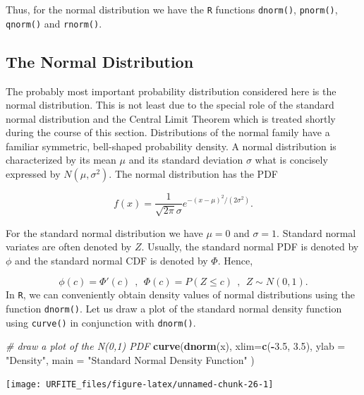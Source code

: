 \documentclass[]{book}
\newenvironment{Shaded}{\begin{snugshade}}{\end{snugshade}}
\newcommand{\KeywordTok}[1]{\textcolor[rgb]{0.13,0.29,0.53}{\textbf{#1}}}
\newcommand{\DataTypeTok}[1]{\textcolor[rgb]{0.13,0.29,0.53}{#1}}
\newcommand{\FloatTok}[1]{\textcolor[rgb]{0.00,0.00,0.81}{#1}}
\newcommand{\StringTok}[1]{\textcolor[rgb]{0.31,0.60,0.02}{#1}}
\newcommand{\CommentTok}[1]{\textcolor[rgb]{0.56,0.35,0.01}{\textit{#1}}}
\newcommand{\OperatorTok}[1]{\textcolor[rgb]{0.81,0.36,0.00}{\textbf{#1}}}
\newcommand{\NormalTok}[1]{#1}
\theoremstyle{definition}
\theoremstyle{definition}
\theoremstyle{definition}
\theoremstyle{remark}
\begin{document}
Thus, for the normal distribution we have the \texttt{R} functions
\texttt{dnorm()}, \texttt{pnorm()}, \texttt{qnorm()} and
\texttt{rnorm()}.

\subsection*{The Normal Distribution}\label{the-normal-distribution}

The probably most important probability distribution considered here is
the normal distribution. This is not least due to the special role of
the standard normal distribution and the Central Limit Theorem which is
treated shortly during the course of this section. Distributions of the
normal family have a familiar symmetric, bell-shaped probability
density. A normal distribution is characterized by its mean \(\mu\) and
its standard deviation \(\sigma\) what is concisely expressed by
\(N(\mu,\sigma^2)\). The normal distribution has the PDF

\[ f(x) = \frac{1}{\sqrt{2 \pi} \sigma} e^{-(x - μ)^2/(2 σ^2)}. \]

For the standard normal distribution we have \(\mu=0\) and \(\sigma=1\).
Standard normal variates are often denoted by \(Z\). Usually, the
standard normal PDF is denoted by \(\phi\) and the standard normal CDF
is denoted by \(\Phi\). Hence,

\[ \phi(c) = \Phi'(c) \ \ , \ \ \Phi(c) = P(Z \leq c) \ \ , \ \ Z \sim N(0,1).
\] In \texttt{R}, we can conveniently obtain density values of normal
distributions using the function \texttt{dnorm()}. Let us draw a plot of
the standard normal density function using \texttt{curve()} in
conjunction with \texttt{dnorm()}.

\begin{Shaded}
\begin{Highlighting}[]
\CommentTok{# draw a plot of the N(0,1) PDF}
\KeywordTok{curve}\NormalTok{(}\KeywordTok{dnorm}\NormalTok{(x),}
      \DataTypeTok{xlim=}\KeywordTok{c}\NormalTok{(}\OperatorTok{-}\FloatTok{3.5}\NormalTok{, }\FloatTok{3.5}\NormalTok{),}
      \DataTypeTok{ylab =} \StringTok{"Density"}\NormalTok{, }
      \DataTypeTok{main =} \StringTok{"Standard Normal Density Function"}
\NormalTok{      ) }
\end{Highlighting}
\end{Shaded}

\begin{center}\texttt{[image: URFITE\_files/figure-latex/unnamed-chunk-26-1]} \end{center}
\end{document}
